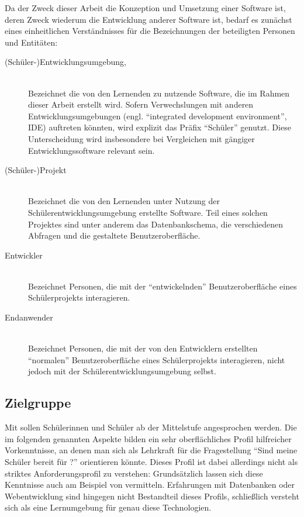 Da der Zweck dieser Arbeit die Konzeption und Umsetzung einer Software ist, deren Zweck wiederum die Entwicklung anderer Software ist, bedarf es zunächst eines einheitlichen Verständnisses für die Bezeichnungen der beteiligten Personen und Entitäten:

\begin{description}
\item[(Schüler-)Entwicklungsumgebung, \idename{}] \hfill\\
  Bezeichnet die von den Lernenden zu nutzende Software, die im Rahmen dieser Arbeit erstellt wird. Sofern Verwechslungen mit anderen Entwicklungsumgebungen (engl. ``integrated development environment'', IDE) auftreten könnten, wird explizit das Präfix ``Schüler'' genutzt. Diese Unterscheidung wird insbesondere bei Vergleichen mit gängiger Entwicklungssoftware relevant sein.
\item[(Schüler-)Projekt] \hfill\\
  Bezeichnet die von den Lernenden unter Nutzung der Schülerentwicklungsumgebung erstellte Software. Teil eines solchen Projektes sind unter anderem das Datenbankschema, die verschiedenen Abfragen und die gestaltete Benutzeroberfläche.
\item[Entwickler] \hfill\\
  Bezeichnet Personen, die mit der ``entwickelnden'' Benutzeroberfläche eines Schülerprojekts interagieren.
\item[Endanwender] \hfill\\
  Bezeichnet Personen, die mit der von den Entwicklern erstellten ``normalen'' Benutzeroberfläche eines Schülerprojekts interagieren, nicht jedoch mit der Schülerentwicklungsumgebung selbst.
\end{description}

\subsection{Zielgruppe}
\label{sec:target-audience}

Mit \idename{} sollen Schülerinnen und Schüler ab der Mittelstufe angesprochen werden. Die im folgenden genannten Aspekte bilden ein sehr oberflächliches Profil hilfreicher Vorkenntnisse, an denen man sich als Lehrkraft für die Fragestellung "`Sind meine Schüler bereit für \idename{}?"' orientieren könnte. Dieses Profil ist dabei allerdings nicht als striktes Anforderungsprofil zu verstehen: Grundsätzlich lassen sich diese Kenntnisse auch am Beispiel von \idename{} vermitteln. Erfahrungen mit Datenbanken oder Webentwicklung sind hingegen nicht Bestandteil dieses Profils, schließlich versteht sich \idename{} als eine Lernumgebung für genau diese Technologien.

